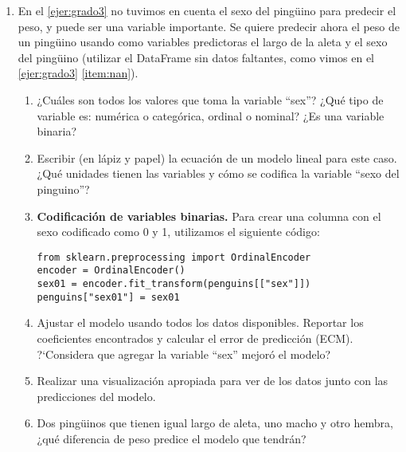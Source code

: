 \documentclass[a4paper,11pt]{article}
\theoremstyle{definition}
\begin{document}
\begin{enumerate}
\begin{enumerate}
En base a estos gr\'aficos, si quisiéramos predecir la ganancia mediante un modelo lineal utilizando una sola variable predictora, ¿cu\'al variable utilizar\'ia? Diseñar un experimento para verificar su respuesta.
\item En este ejemplo, ¿considera que un modelo lineal multivariado ayudar\'ia a predecir mejor la ganancia que el modelo lineal univariado del ítem anterior? Realizar un experimento para verificar su respuesta.
\end{enumerate}

\item En el \ref{ejer:grado3} no tuvimos en cuenta el sexo del ping\"uino para predecir el peso, y puede ser una variable importante. Se quiere predecir ahora el peso de un ping\"uino usando como variables predictoras el largo de la aleta y el sexo del ping\"uino (utilizar el DataFrame sin datos faltantes, como vimos en el \ref{ejer:grado3} \ref{item:nan}).
\begin{enumerate}
\item ¿Cu\'ales son todos los valores que toma la variable ``sex''? ¿Qu\'e tipo de variable es: numérica o categórica, ordinal o nominal? ¿Es una variable binaria?

\item Escribir (en lápiz y papel) la ecuación de un modelo lineal para este caso. ¿Qué unidades tienen las variables y cómo se codifica la variable “sexo del pinguino”?

\item \textbf{Codificación de variables binarias.} Para crear una columna con el sexo codificado como 0 y 1, utilizamos el siguiente c\'odigo:
\begin{lstlisting}
from sklearn.preprocessing import OrdinalEncoder
encoder = OrdinalEncoder()
sex01 = encoder.fit_transform(penguins[["sex"]])
penguins["sex01"] = sex01
\end{lstlisting}

\item Ajustar el modelo usando todos los datos disponibles. Reportar los coeficientes encontrados y calcular el error de predicción (ECM). ?`Considera que agregar la variable ``sex'' mejoró el modelo?
\item Realizar una visualización apropiada para ver de los datos junto con las predicciones del modelo.
\item Dos ping\"uinos que tienen igual largo de aleta, uno macho y otro hembra, ¿qué diferencia de peso predice el modelo que tendrán?
\end{enumerate}


\end{enumerate}
\end{document}
